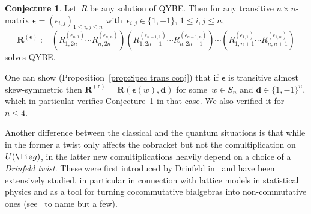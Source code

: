 \documentclass[12pt, reqno]{amsart}
\theoremstyle{definition}
\newtheorem{conjecture}[theorem]{Conjecture}
\numberwithin{equation}{section}
\newcommand{\sgna}[1]{\boldsymbol{\epsilon}(#1)}
\begin{document}
\begin{conjecture}\label{conj:QCYBE trans 1,-1}
Let~$R$ be any solution of QYBE. Then
for any transitive $n\times n$-matrix $\boldsymbol{\epsilon}=(\epsilon_{i,j})_{1\le i,j\le n}$ with~$\epsilon_{i,j}\in\{1,-1\}$, $1\le i,j\le n$,
\begin{equation}\label{eq:R eps defn}
\mathbf R^{(\boldsymbol{\epsilon})}:=
(R_{1,2n}^{(\epsilon_{n,1})}\cdots 
R_{n,2n}^{(\epsilon_{n,n})}) 
(R_{1,2n-1}^{(\epsilon_{n-1,1})}\cdots 
R_{n,2n-1}^{(\epsilon_{n-1,n})})
\cdots (R_{1,n+1}^{(\epsilon_{1,1})}\cdots R_{n,n+1}^{(\epsilon_{1,n})})
\end{equation}
solves QYBE.
\end{conjecture}
One can show (Proposition~\ref{prop:Spec trans conj})
that if $\boldsymbol\epsilon$ is transitive almost skew-symmetric
then $\mathbf R^{(\boldsymbol{\epsilon})}=\mathbf R(\sgna w,\boldsymbol{d})$ for some~$w\in S_n$ and
$\boldsymbol{d}\in\{1,-1\}^n$, which in particular
verifies Conjecture~\ref{conj:QCYBE trans 1,-1} in that case. We also verified it for~$n\le 4$.

Another difference between the classical and the quantum situations is that while in the former
a twist only affects the cobracket but not the comultiplication on~$U(\lie g)$, in the latter new comultiplications heavily depend on a choice of a {\em 
Drinfeld twist}. These were first introduced by Drinfeld in~\cite{Drinf} and have been extensively
studied, in particular in connection with lattice models in statistical physics and as a tool
for turning cocommutative bialgebras into non-commutative ones (see~\cites{CPbook,BB,Ter,BoW,MS,Tor,Majid,Ne} to name but a few). 
\end{document}
